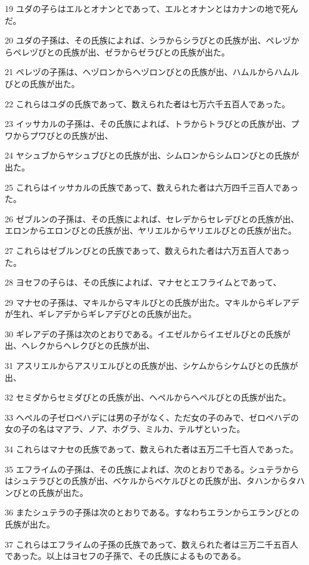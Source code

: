 \par 19 ユダの子らはエルとオナンとであって、エルとオナンとはカナンの地で死んだ。
\par 20 ユダの子孫は、その氏族によれば、シラからシラびとの氏族が出、ペレヅからペレヅびとの氏族が出、ゼラからゼラびとの氏族が出た。
\par 21 ペレヅの子孫は、ヘヅロンからヘヅロンびとの氏族が出、ハムルからハムルびとの氏族が出た。
\par 22 これらはユダの氏族であって、数えられた者は七万六千五百人であった。
\par 23 イッサカルの子孫は、その氏族によれば、トラからトラびとの氏族が出、プワからプワびとの氏族が出、
\par 24 ヤシュブからヤシュブびとの氏族が出、シムロンからシムロンびとの氏族が出た。
\par 25 これらはイッサカルの氏族であって、数えられた者は六万四千三百人であった。
\par 26 ゼブルンの子孫は、その氏族によれば、セレデからセレデびとの氏族が出、エロンからエロンびとの氏族が出、ヤリエルからヤリエルびとの氏族が出た。
\par 27 これらはゼブルンびとの氏族であって、数えられた者は六万五百人であった。
\par 28 ヨセフの子らは、その氏族によれば、マナセとエフライムとであって、
\par 29 マナセの子孫は、マキルからマキルびとの氏族が出た。マキルからギレアデが生れ、ギレアデからギレアデびとの氏族が出た。
\par 30 ギレアデの子孫は次のとおりである。イエゼルからイエゼルびとの氏族が出、ヘレクからヘレクびとの氏族が出、
\par 31 アスリエルからアスリエルびとの氏族が出、シケムからシケムびとの氏族が出、
\par 32 セミダからセミダびとの氏族が出、ヘペルからヘペルびとの氏族が出た。
\par 33 ヘペルの子ゼロペハデには男の子がなく、ただ女の子のみで、ゼロペハデの女の子の名はマアラ、ノア、ホグラ、ミルカ、テルザといった。
\par 34 これらはマナセの氏族であって、数えられた者は五万二千七百人であった。
\par 35 エフライムの子孫は、その氏族によれば、次のとおりである。シュテラからはシュテラびとの氏族が出、ベケルからベケルびとの氏族が出、タハンからタハンびとの氏族が出た。
\par 36 またシュテラの子孫は次のとおりである。すなわちエランからエランびとの氏族が出た。
\par 37 これらはエフライムの子孫の氏族であって、数えられた者は三万二千五百人であった。以上はヨセフの子孫で、その氏族によるものである。
